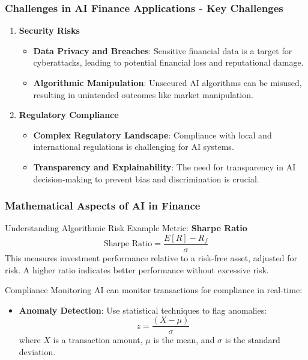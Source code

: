 \documentclass[aspectratio=169]{beamer}
\begin{document}
\begin{frame}[fragile]
    \frametitle{Challenges in AI Finance Applications - Key Challenges}
    \begin{enumerate}
        \item \textbf{Security Risks}
            \begin{itemize}
                \item \textbf{Data Privacy and Breaches}: Sensitive financial data is a target for cyberattacks, leading to potential financial loss and reputational damage.
                \item \textbf{Algorithmic Manipulation}: Unsecured AI algorithms can be misused, resulting in unintended outcomes like market manipulation.
            \end{itemize}
        \item \textbf{Regulatory Compliance}
            \begin{itemize}
                \item \textbf{Complex Regulatory Landscape}: Compliance with local and international regulations is challenging for AI systems.
                \item \textbf{Transparency and Explainability}: The need for transparency in AI decision-making to prevent bias and discrimination is crucial.
            \end{itemize}
    \end{enumerate}
\end{frame}

\begin{frame}[fragile]
    \frametitle{Mathematical Aspects of AI in Finance}
    \begin{block}{Understanding Algorithmic Risk}
        Example Metric: \textbf{Sharpe Ratio}
        \[
        \text{Sharpe Ratio} = \frac{E[R] - R_f}{\sigma}
        \]
        This measures investment performance relative to a risk-free asset, adjusted for risk. A higher ratio indicates better performance without excessive risk.
    \end{block}

    \begin{block}{Compliance Monitoring}
        AI can monitor transactions for compliance in real-time:
        \begin{itemize}
            \item \textbf{Anomaly Detection}: Use statistical techniques to flag anomalies:
            \[
            z = \frac{(X - \mu)}{\sigma}
            \]
            where \(X\) is a transaction amount, \(\mu\) is the mean, and \(\sigma\) is the standard deviation.
        \end{itemize}
    \end{block}
\end{frame}
\end{document}
